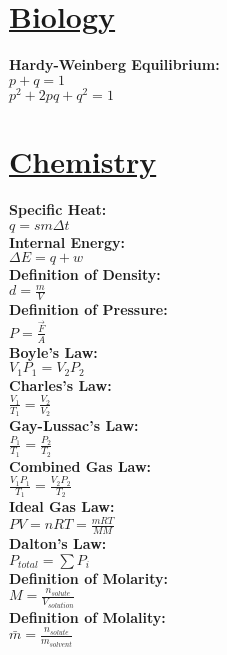 \documentclass[12pt]{article}
\begin{document}
\twocolumn

\section*{\underline{Biology}}
\textbf{Hardy-Weinberg Equilibrium:}
    \\ \( p+q=1 \)
    \\ \( p^{2}+2pq+q^{2}=1 \)



\section*{\underline{Chemistry}}
\textbf{Specific Heat:}
    \\ \( q = sm \Delta t \)
\\ \textbf{Internal Energy:}
    \\ \( \Delta E = q + w \)
\\ \textbf{Definition of Density:}
    \\ \( d = \displaystyle\frac{ m }{ V } \)
\\ \textbf{Definition of Pressure:}
    \\ \( P = \displaystyle\frac{ \vec{ F } }{ A } \)
\\ \textbf{Boyle’s Law:}
    \\ \( V_1 P_1 = V_2 P_2 \)
\\ \textbf{Charles's Law:}
    \\ \( \displaystyle\frac{ V_1 }{ T_1 } = \displaystyle\frac{ V_2 }{ V_2 } \)
\\ \textbf{Gay-Lussac’s Law:}
    \\ \( \displaystyle\frac{ P_1 }{ T_1 } = \displaystyle\frac{ P_2 }{ T_2 } \)
\\ \textbf{Combined Gas Law:}
    \\ \( \displaystyle\frac{ V_1 P_1 }{ T_1 } = \displaystyle\frac{ V_2 P_2 }{ T_2 } \)
\\ \textbf{Ideal Gas Law:}
    \\ \( PV = nRT = \displaystyle\frac{ mRT }{ MM } \)
\\ \textbf{Dalton's Law:}
    \\ \( P_{total} = \displaystyle\sum{ P_i } \)
\\ \textbf{Definition of Molarity:}
    \\ \( M = \displaystyle\frac{ n_{solute} }{ V_{solution} } \)
\\ \textbf{Definition of Molality:}
    \\ \( \bar{ m } = \displaystyle\frac{ n_{solute} }{ m_{solvent} } \)
\end{document}
